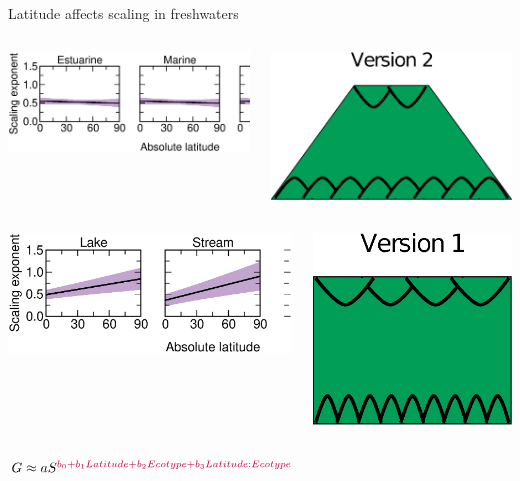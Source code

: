 \documentclass{beamer}
\begin{document}
  \begin{frame}{Latitude affects scaling in freshwaters}

    \begin{columns}
    \column{.5in}
    \column{2.75in}
      \begin{center}
      \includegraphics[height=.8in]{Figures/results/no_effect.eps}
      \end{center}


    \column{.25in}
    \column{1in}
      \begin{center}

        \includegraphics[height=.65in]{Figures/version2.eps}
        \vspace{.3in}

      \end{center}

    \column{.5in}
    \end{columns}

    \begin{columns}
    \column{.5in}
    \column{2.75in}
      \begin{center}

      \includegraphics[height=.8in]{Figures/results/effect.eps}
      \end{center}

    \column{.25in}
    \column{1in}
      \begin{center}

        \includegraphics[height=.65in]{Figures/version1.eps}
        \vspace{.3in}

      \end{center}

    \column{.5in}
    \end{columns}


    \vspace{.1in}

    \begin{center}

    {\Large $G \approx aS^{\color{purple}b_0+b_1Latitude+b_2Ecotype+b_3Latitude:Ecotype}$}

    \end{center}

  \end{frame}
\end{document}
